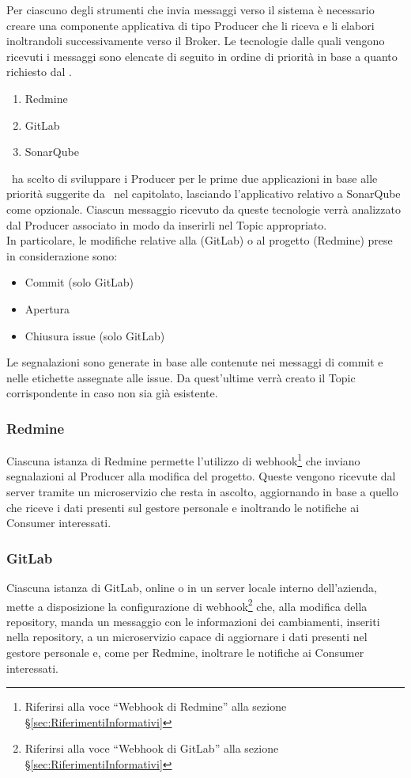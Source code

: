 		Per ciascuno degli strumenti che invia messaggi verso il sistema è necessario creare una componente applicativa di tipo Producer che li riceva e li elabori inoltrandoli successivamente verso il Broker.
		Le tecnologie dalle quali vengono ricevuti i messaggi sono elencate di seguito in ordine di priorità in base a quanto richiesto dal .
		\begin{enumerate}
			\item Redmine
			\item GitLab
			\item SonarQube
		\end{enumerate}
		\gruppo\ ha scelto di sviluppare i Producer per le prime due applicazioni in base alle priorità suggerite da \II\ nel capitolato, lasciando l'applicativo relativo a SonarQube come opzionale.
		Ciascun messaggio ricevuto da queste tecnologie verrà analizzato dal Producer associato in modo da inserirli nel Topic appropriato.\\
		In particolare, le modifiche relative alla  (GitLab) o al progetto (Redmine) prese in considerazione sono:
		\begin{itemize}
			\item Commit (solo GitLab)
			\item Apertura  
			\item Chiusura issue (solo GitLab)
		\end{itemize}
		Le segnalazioni sono generate in base alle  contenute nei messaggi di commit e nelle etichette assegnate alle issue.
		Da quest'ultime verrà creato il Topic corrispondente in caso non sia già esistente.
		
		\subsubsection{Redmine}
		Ciascuna istanza di Redmine permette l'utilizzo di webhook\footnote{Riferirsi alla voce ``Webhook di Redmine'' alla sezione \S\ref{sec:RiferimentiInformativi}} che inviano segnalazioni al Producer alla modifica del progetto.
		Queste vengono ricevute dal server tramite un microservizio che resta in ascolto, aggiornando in base a quello che riceve i dati presenti sul gestore personale e inoltrando le notifiche ai Consumer interessati.
		
		\subsubsection{GitLab}
		Ciascuna istanza di GitLab, online o in un server locale interno dell'azienda, mette a disposizione la configurazione di webhook\footnote{Riferirsi alla voce ``Webhook di GitLab'' alla sezione \S\ref{sec:RiferimentiInformativi}} che, alla modifica della repository, manda un messaggio con le informazioni dei cambiamenti, inseriti nella repository, a un microservizio capace di aggiornare i dati presenti nel gestore personale e, come per Redmine, inoltrare le notifiche ai Consumer interessati.
		
